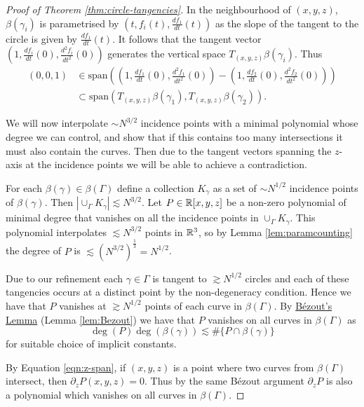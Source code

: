 \begin{proof}[Proof of Theorem \ref{thm:circle-tangencies}]
    In the neighbourhood of $(x,y,z)$, $\beta(\gamma_i)$ is parametrised by $\left(t,f_i (t) ,\frac{df_1}{dt}(t) \right)$ as the slope of the tangent to the circle is given by $\frac{df_1}{dt}(t)$.
     It follows that the tangent vector
    $\left(1,\frac{df_i}{dt}(0), \frac{d^2f_i}{dt^2} (0) \right)$ generates the vertical space $T_{(x,y,z)} \beta(\gamma_i)$. Thus 
    \begin{align} (0,0,1) &\in \text{span}\left( \left(1,\frac{df_1}{dt}(0), \frac{d^2f_1}{dt^2} (0) \right) - \left(1,\frac{df_2}{dt}(0), \frac{d^2f_2}{dt^2} (0) \right) \right) \nonumber
    \\ &\subset \text{span} \left( T_{(x,y,z) }\beta (\gamma_1), T_{(x,y,z) }\beta (\gamma_2)\right). \label{eqn:z-span}
    \end{align}

    We will now interpolate $\sim N^{3/2}$ incidence points with a minimal polynomial whose degree we can control, and show that if this contains too many intersections it must also contain the curves. 
    Then due to the tangent vectors spanning the $z$-axis at the incidence points we will be able to achieve a contradiction.

    For each $\beta(\gamma) \in \beta(\Gamma)$ define a collection $K_\gamma$ as a set of $\sim N^{1/2}$ incidence points of $\beta(\gamma)$. Then $|\cup_\Gamma K_\gamma| \lesssim N^{3/2}$.
    Let $P \in \mathbb R[x,y,z]$ be a non-zero polynomial of minimal degree that vanishes on all the incidence points in $\cup_\Gamma K_\gamma$. 
    This polynomial interpolates $\lesssim N^{3/2}$ points in $\mathbb R^3$, so by Lemma \ref{lem:paramcounting}
    the degree of $P$ is $\lesssim \left(N^{3/2}\right)^{\frac{1}{3}} =  N^{1/2}$.

    Due to our refinement each $\gamma \in \Gamma$ is 
    tangent to $\gtrsim N^{1/2}$ circles and each of these tangencies occurs at a distinct point by the non-degeneracy condition.   
    Hence we have that $P$ vanishes at $\gtrsim N^{1/2}$ points of each curve in $\beta (\Gamma)$.
    By \hyperref[lem:Bezout]{Bézout's Lemma} (Lemma \ref{lem:Bezout}) we have that $P$ vanishes on all curves in $\beta(\Gamma)$ as
    \[
    \deg (P) \deg (\beta(\gamma))  \lesssim \# \{ P \cap \beta(\gamma)\}  
    \]
    for suitable choice of implicit constants. 

    By Equation \ref{eqn:z-span}, if $(x,y,z)$ is a point where two curves from $\beta (\Gamma)$ intersect, then $\partial_z P (x,y,z)  =0 $. 
    Thus by the same Bézout argument $\partial_z P$ is also a polynomial which vanishes on all curves in $\beta(\Gamma)$. 


\end{proof}
